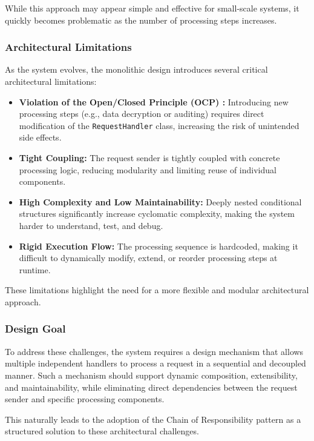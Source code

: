 While this approach may appear simple and effective for small-scale systems, it quickly becomes problematic as the number of processing steps increases.

\subsubsection{Architectural Limitations}
As the system evolves, the monolithic design introduces several critical architectural limitations:

\begin{itemize}
    \item \textbf{Violation of the Open/Closed Principle (OCP) \cite{martin2000design}:} Introducing new processing steps (e.g., data decryption or auditing) requires direct modification of the \texttt{RequestHandler} class, increasing the risk of unintended side effects.
    
    \item \textbf{Tight Coupling:} The request sender is tightly coupled with concrete processing logic, reducing modularity and limiting reuse of individual components.
    
    \item \textbf{High Complexity and Low Maintainability:} Deeply nested conditional structures significantly increase cyclomatic complexity, making the system harder to understand, test, and debug.
    
    \item \textbf{Rigid Execution Flow:} The processing sequence is hardcoded, making it difficult to dynamically modify, extend, or reorder processing steps at runtime.
\end{itemize}

These limitations highlight the need for a more flexible and modular architectural approach.

\subsubsection{Design Goal}
To address these challenges, the system requires a design mechanism that allows multiple independent handlers to process a request in a sequential and decoupled manner. Such a mechanism should support dynamic composition, extensibility, and maintainability, while eliminating direct dependencies between the request sender and specific processing components.

This naturally leads to the adoption of the Chain of Responsibility pattern as a structured solution to these architectural challenges.